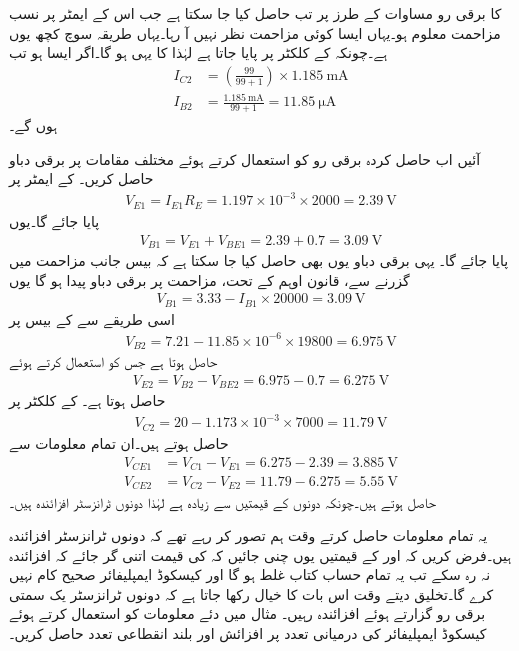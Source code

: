  کا برقی رو مساوات  کے طرز پر تب حاصل کیا جا سکتا ہے جب اس کے ایمٹر پر نسب مزاحمت معلوم ہو۔یہاں ایسا کوئی مزاحمت نظر نہیں آ رہا۔یہاں طریقہ سوچ کچھ یوں ہے۔چونکہ  کے کلکٹر  پر  پایا جاتا ہے لہٰذا  کا  یہی ہو گا۔اگر ایسا ہو تب
\begin{align*}
I_{C2}&=\left(\frac{99}{99+1}\right) \times \SI{1.185}{\milli \ampere}\\
I_{B2}&=\frac{\SI{1.185}{\milli \ampere}}{99+1}=\SI{11.85}{\micro \ampere}
\end{align*} 
ہوں گے۔

آئیں اب حاصل کردہ برقی رو کو استعمال کرتے ہوئے مختلف مقامات پر برقی دباو حاصل کریں۔ کے ایمٹر پر
\begin{align*}
V_{E1}=I_{E1} R_E=1.197 \times 10^{-3} \times 2000=\SI{2.39}{\volt}
\end{align*}
پایا جائے گا۔یوں
\begin{align*}
V_{B1}=V_{E1}+V_{BE1}=2.39+0.7=\SI{3.09}{\volt}
\end{align*}
پایا جائے گا۔ یہی برقی دباو یوں بھی حاصل کیا جا سکتا ہے کہ بیس  جانب  مزاحمت میں  گزرنے سے،   قانون اوہم  کے تحت، مزاحمت پر  برقی دباو پیدا ہو گا یوں
\begin{align*}
V_{B1}=3.33-I_{B1} \times 20000=\SI{3.09}{\volt}
\end{align*}
اسی طریقے سے   کے بیس  پر
\begin{align*}
V_{B2}=7.21 -11.85 \times 10^{-6} \times 19800=\SI{6.975}{\volt} 
\end{align*}
حاصل ہوتا ہے جس کو استعمال کرتے ہوئے
\begin{align*}
V_{E2}=V_{B2}-V_{BE2}=6.975-0.7=\SI{6.275}{\volt}
\end{align*}
حاصل ہوتا ہے۔ کے کلکٹر  پر
\begin{align*}
V_{C2}=20 -1.173 \times 10^{-3} \times 7000=\SI{11.79}{\volt}
\end{align*}
حاصل ہوتے ہیں۔ان تمام معلومات سے
\begin{align*}
V_{CE1}&=V_{C1}-V_{E1}=6.275-2.39=\SI{3.885}{\volt}\\
V_{CE2}&=V_{C2}-V_{E2}=11.79-6.275=\SI{5.55}{\volt}
\end{align*}
حاصل ہوتے ہیں۔چونکہ دونوں  کے قیمتیں  سے زیادہ ہے لہٰذا دونوں ٹرانزسٹر افزائندہ ہیں۔

یہ تمام معلومات حاصل کرتے وقت ہم تصور کر رہے تھے کہ دونوں ٹرانزسٹر افزائندہ ہیں۔فرض کریں کہ  اور  کے قیمتیں یوں چنی جائیں کہ  کی قیمت اتنی گر جائے کہ  افزائندہ نہ رہ سکے تب یہ تمام حساب کتاب غلط ہو گا اور کیسکوڈ ایمپلیفائر صحیح کام نہیں کرے گا۔تخلیق دیتے وقت اس بات کا خیال رکھا جاتا ہے کہ دونوں ٹرانزسٹر یک سمتی  برقی رو گزارتے ہوئے افزائندہ رہیں۔
مثال  میں دئے معلومات کو استعمال کرتے ہوئے کیسکوڈ ایمپلیفائر کی درمیانی تعدد پر افزائش  اور بلند انقطاعی تعدد  حاصل کریں۔

